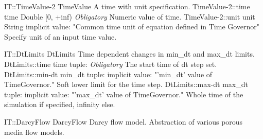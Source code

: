 \begin{TupleType}
	{IT::TimeValue-2}
	{TimeValue}
	{}%
	{}%
	{{{A time with unit specification.}%
}}
		\RecKey
			{TimeValue-2::time}
			{time}
			{{Double [0, +inf)}}{}
			{ \it{Obligatory}}
			{{{Numeric value of time.}%
}}
		\RecKey
			{TimeValue-2::unit}
			{unit}
			{{String}}{}
			{implicit value: "{Common time unit of equation defined in Time Governor}"}
			{{{Specify unit of an input time value.}%
}}
\end{TupleType}
\begin{TupleType}
	{IT::DtLimits}
	{DtLimits}
	{}%
	{}%
	{{{Time dependent changes in min{\_}dt and max{\_}dt limits.}%
}}
		\RecKey
			{DtLimits::time}
			{time}
			{{tuple: }}{}
			{ \it{Obligatory}}
			{{{The start time of dt step set.}%
}}
		\RecKey
			{DtLimits::min-dt}
			{min{\_}dt}
			{{tuple: }}{}
			{implicit value: "{'min{\_}dt' value of TimeGovernor.}"}
			{{{Soft lower limit for the time step.}%
}}
		\RecKey
			{DtLimits::max-dt}
			{max{\_}dt}
			{{tuple: }}{}
			{implicit value: "{'max{\_}dt' value of TimeGovernor.}"}
			{{{Whole time of the simulation if specified, infinity else.}%
}}
\end{TupleType}
\begin{AbstractType}
	{IT::DarcyFlow}
	{DarcyFlow}
	{}
	{{{Darcy flow model.
Abstraction of various porous media flow models.}%
}}
\end{AbstractType}

